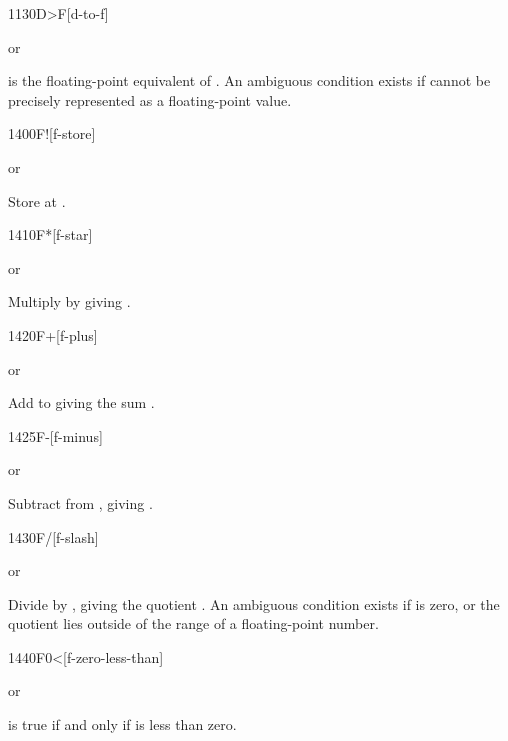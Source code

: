 \begin{worddef}[DtoF]{1130}{D>F}[d-to-f]
\item {}  or

	 is the floating-point equivalent of . An ambiguous
	condition exists if  cannot be precisely represented as a
	floating-point value.
\end{worddef}


\begin{worddef}{1400}{F!}[f-store]
\item {}  or

	Store  at .
\end{worddef}


\begin{worddef}{1410}{F*}[f-star]
\item {} or

	Multiply  by  giving .
\end{worddef}


\begin{worddef}{1420}{F+}[f-plus]
\item {} or

	Add  to  giving the sum .
\end{worddef}


\begin{worddef}{1425}{F-}[f-minus]
\item {} or

	Subtract  from , giving .
\end{worddef}


\begin{worddef}{1430}{F/}[f-slash]
\item {} or

	Divide  by , giving the quotient
	. An ambiguous condition exists if  is
	zero, or the quotient lies outside 	of the range of a
	floating-point number.
\end{worddef}


\begin{worddef}[F0less]{1440}{F0<}[f-zero-less-than]
\item {}  or

	 is true if and only if  is less than
	zero.
\end{worddef}


